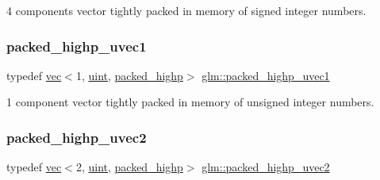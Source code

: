 4 components vector tightly packed in memory of signed integer numbers. 

\mbox{\label{group__gtc__type__aligned_ga160352f526bef94d143ccb525095936e}} 
\subsubsection{\texorpdfstring{packed\+\_\+highp\+\_\+uvec1}{packed\_highp\_uvec1}}
{\footnotesize\ttfamily typedef \mbox{\hyperlink{structglm_1_1vec}{vec}}$<$1, \mbox{\hyperlink{group__core__precision_ga4fd29415871152bfb5abd588334147c8}{uint}}, \mbox{\hyperlink{namespaceglm_a36ed105b07c7746804d7fdc7cc90ff25a8e8791ee77fe079b1291f710d88031bf}{packed\+\_\+highp}}$>$ \mbox{\hyperlink{group__gtc__type__aligned_ga160352f526bef94d143ccb525095936e}{glm\+::packed\+\_\+highp\+\_\+uvec1}}}



1 component vector tightly packed in memory of unsigned integer numbers. 

\mbox{\label{group__gtc__type__aligned_gafd17d664314ead069de290b1d5137c47}} 
\subsubsection{\texorpdfstring{packed\+\_\+highp\+\_\+uvec2}{packed\_highp\_uvec2}}
{\footnotesize\ttfamily typedef \mbox{\hyperlink{structglm_1_1vec}{vec}}$<$2, \mbox{\hyperlink{group__core__precision_ga4fd29415871152bfb5abd588334147c8}{uint}}, \mbox{\hyperlink{namespaceglm_a36ed105b07c7746804d7fdc7cc90ff25a8e8791ee77fe079b1291f710d88031bf}{packed\+\_\+highp}}$>$ \mbox{\hyperlink{group__gtc__type__aligned_gafd17d664314ead069de290b1d5137c47}{glm\+::packed\+\_\+highp\+\_\+uvec2}}}



